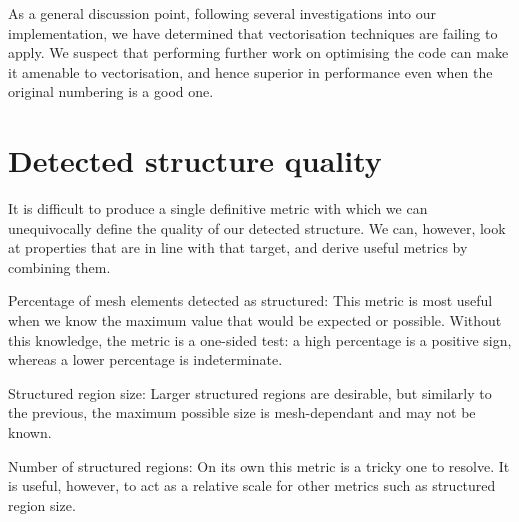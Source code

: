 As a general discussion point, following several investigations into our implementation, we have determined that vectorisation techniques are failing to apply. We suspect that performing further work on optimising the code can make it amenable to vectorisation, and hence superior in performance even when the original numbering is a good one.



\section{Detected structure quality}
It is difficult to produce a single definitive metric with which we can unequivocally define the quality of our detected structure. We can, however, look at properties that are in line with that target, and derive useful metrics by combining them.

Percentage of mesh elements detected as structured:
This metric is most useful when we know the maximum value that would be expected or possible.
Without this knowledge, the metric is a one-sided test: a high percentage is a positive sign, whereas a lower percentage is indeterminate.

Structured region size:
Larger structured regions are desirable, but similarly to the previous, the maximum possible size is mesh-dependant and may not be known.

Number of structured regions:
On its own this metric is a tricky one to resolve. It is useful, however, to act as a relative scale for other metrics such as structured region size.








